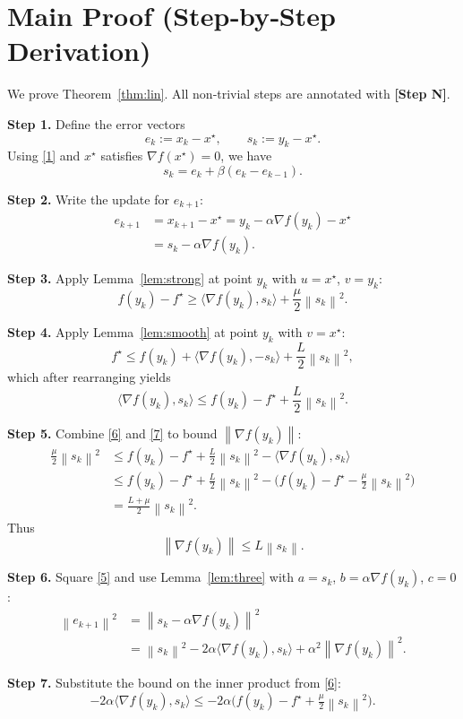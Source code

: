 \documentclass[11pt]{article}
\newcommand{\norm}[1]{\left\|#1\right\|}
\newcommand{\ip}[2]{\langle #1,#2\rangle}
\newcommand{\grad}{\nabla}
\begin{document}
\section*{Main Proof (Step‑by‑Step Derivation)}
We prove Theorem~\ref{thm:lin}.  
All non‑trivial steps are annotated with \textbf{[Step N]}.

\bigskip
\noindent\textbf{Step 1.} Define the error vectors
\[
e_k:=x_k-x^\star,\qquad
s_k:=y_k-x^\star.
\]
Using \eqref{1} and $x^\star$ satisfies $\grad f(x^\star)=0$, we have
\[
s_k = e_k + \beta(e_k-e_{k-1}). \tag{4}
\]

\noindent\textbf{Step 2.} Write the update for $e_{k+1}$:
\[
\begin{aligned}
e_{k+1}
&= x_{k+1}-x^\star
 = y_k - \alpha\grad f(y_k)-x^\star \\
&= s_k - \alpha\grad f(y_k). \tag{5}
\end{aligned}
\]

\noindent\textbf{Step 3.} Apply Lemma~\ref{lem:strong} at point $y_k$ with $u=x^\star$, $v=y_k$:
\[
f(y_k)-f^\star \ge \ip{\grad f(y_k)}{s_k} + \frac{\mu}{2}\norm{s_k}^2.
\tag{6}
\]

\noindent\textbf{Step 4.} Apply Lemma~\ref{lem:smooth} at point $y_k$ with $v=x^\star$:
\[
f^\star \le f(y_k) + \ip{\grad f(y_k)}{-s_k} + \frac{L}{2}\norm{s_k}^2,
\]
which after rearranging yields
\[
\ip{\grad f(y_k)}{s_k} \le f(y_k)-f^\star + \frac{L}{2}\norm{s_k}^2.
\tag{7}
\]

\noindent\textbf{Step 5.} Combine \eqref{6} and \eqref{7} to bound $\norm{\grad f(y_k)}$:
\[
\begin{aligned}
\frac{\mu}{2}\norm{s_k}^2
&\le f(y_k)-f^\star + \frac{L}{2}\norm{s_k}^2 - \ip{\grad f(y_k)}{s_k} \\
&\le f(y_k)-f^\star + \frac{L}{2}\norm{s_k}^2 - \bigl(f(y_k)-f^\star -\frac{\mu}{2}\norm{s_k}^2\bigr) \\
&= \frac{L+\mu}{2}\norm{s_k}^2 .
\end{aligned}
\]
Thus
\[
\norm{\grad f(y_k)} \le L \norm{s_k}. \tag{8}
\]

\noindent\textbf{Step 6.} Square \eqref{5} and use Lemma~\ref{lem:three} with $a=s_k$, $b=\alpha\grad f(y_k)$, $c=0$:
\[
\begin{aligned}
\norm{e_{k+1}}^2
&= \norm{s_k-\alpha\grad f(y_k)}^2 \\
&= \norm{s_k}^2 -2\alpha\ip{\grad f(y_k)}{s_k} + \alpha^2\norm{\grad f(y_k)}^2.
\end{aligned}
\tag{9}
\]

\noindent\textbf{Step 7.} Substitute the bound on the inner product from \eqref{6}:
\[
-2\alpha\ip{\grad f(y_k)}{s_k}
\le -2\alpha\bigl(f(y_k)-f^\star + \tfrac{\mu}{2}\norm{s_k}^2\bigr).
\tag{10}
\]
\end{document}
